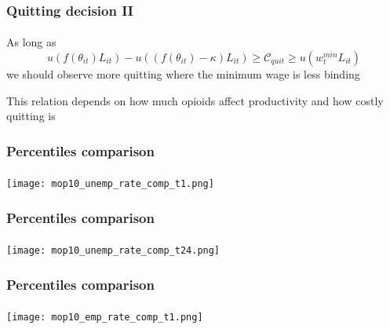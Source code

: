 \begin{frame}

    \frametitle{Quitting decision II} %
    \framesubtitle{}  %
    \rmfamily %

    \begin{wideitemize}
        \item As long as
        \[
        u\left(f(\theta_{it})L_{it}\right) - u\left(\left(f(\theta_{it}) - \kappa\right)L_{it}\right) \geq \mathcal{C}_{quit} \geq u\left(w^{min}_tL_{it}\right)
        \]
        we should observe \textcolor{fblu}{more quitting where the minimum wage is less binding}
        \item This relation depends on \textcolor{fblu}{how much opioids affect productivity} and \textcolor{fblu}{how costly quitting is}
    \end{wideitemize}
    
    \hyperlink{decision_making}{}    

\end{frame}

\begin{frame}

    \label{perc_comparison_1}
    
    \frametitle{Percentiles comparison} %
    \framesubtitle{}  %
    \rmfamily %

    \begin{center}
        \texttt{[image: mop10\_unemp\_rate\_comp\_t1.png]}
    \end{center}
    
    \hyperlink{unemp_rate_result}{}
    
\end{frame}

\begin{frame}

    \label{perc_comparison_12}
    
    \frametitle{Percentiles comparison} %
    \framesubtitle{}  %
    \rmfamily %

    \begin{center}
        \texttt{[image: mop10\_unemp\_rate\_comp\_t24.png]}
    \end{center}
    
    \hyperlink{unemp_rate_result}{}
    
\end{frame}

\begin{frame}

    \label{perc_comparison_2}
    
    \frametitle{Percentiles comparison} %
    \framesubtitle{}  %
    \rmfamily %

    \begin{center}
        \texttt{[image: mop10\_emp\_rate\_comp\_t1.png]}
    \end{center}
    
    \hyperlink{emp_rate_result}{}
    
\end{frame}

